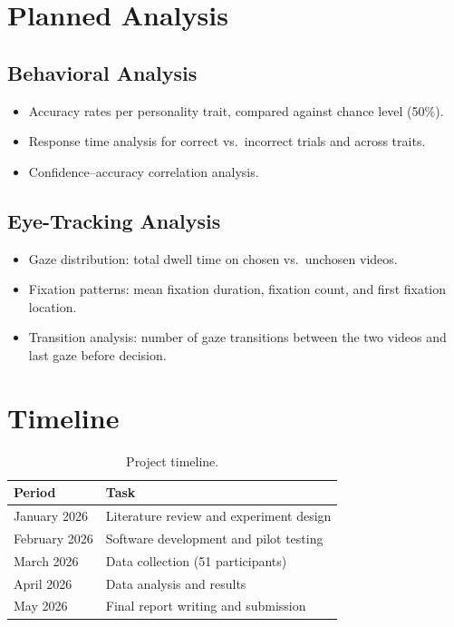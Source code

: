 \documentclass[12pt,a4paper]{article}
\begin{document}
\section{Planned Analysis}

\subsection{Behavioral Analysis}
\begin{itemize}
    \item Accuracy rates per personality trait, compared against chance level (50\%).
    \item Response time analysis for correct vs.\ incorrect trials and across traits.
    \item Confidence--accuracy correlation analysis.
\end{itemize}

\subsection{Eye-Tracking Analysis}
\begin{itemize}
    \item Gaze distribution: total dwell time on chosen vs.\ unchosen videos.
    \item Fixation patterns: mean fixation duration, fixation count, and first fixation location.
    \item Transition analysis: number of gaze transitions between the two videos and last gaze before decision.
\end{itemize}

\section{Timeline}

\begin{table}[H]
\centering
\begin{tabular}{ll}
\toprule
\textbf{Period} & \textbf{Task} \\
\midrule
January 2026 & Literature review and experiment design \\
February 2026 & Software development and pilot testing \\
March 2026 & Data collection (51 participants) \\
April 2026 & Data analysis and results \\
May 2026 & Final report writing and submission \\
\bottomrule
\end{tabular}
\caption{Project timeline.}
\end{table}

\newpage


\end{document}
